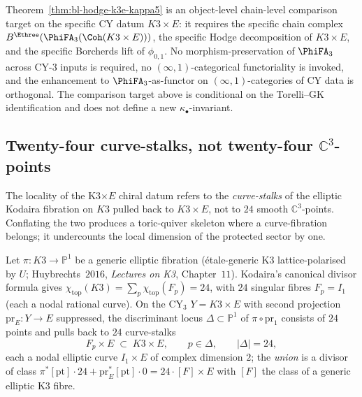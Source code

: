 \begin{remark}
\label{rem:bl-object-level-chain-level-scope-k3e}
Theorem~\ref{thm:bl-hodge-k3e-kappa5} is an object-level chain-level
comparison target on the specific CY datum $K3 \times E$: it requires the
specific chain complex $B^{\Ethree}(\PhiFA_3(\Coh(K3 \times E)))$, the
specific Hodge decomposition of $K3 \times E$, and the specific
Borcherds lift of $\phi_{0, 1}$. No morphism-preservation of $\PhiFA_3$
across CY-$3$ inputs is required, no $(\infty, 1)$-categorical
functoriality is invoked, and the enhancement to $\PhiFA_3$-as-functor on
$(\infty, 1)$-categories of CY data is orthogonal. The comparison target
above is conditional on the Torelli--GK identification and does not define a new
$\kappa_\bullet$-invariant.
\end{remark}

\subsection{Twenty-four curve-stalks, not twenty-four \texorpdfstring{$\mathbb{C}^3$}{C-3}-points}
\label{subsec:24-curve-stalks}

The locality of the K3$\times E$ chiral datum refers to the \emph{curve-stalks} of the elliptic Kodaira fibration on $K3$ pulled back to $K3 \times E$, not to $24$ smooth $\mathbb{C}^3$-points. Conflating the two produces a toric-quiver skeleton where a curve-fibration belongs; it undercounts the local dimension of the protected sector by one.

\begin{proposition}
\label{prop:kodaira-I1-curve-stalks-k3xE}
Let $\pi \colon K3 \to \mathbb{P}^1$ be a generic elliptic fibration (\'etale-generic K3 lattice-polarised by $U$; Huybrechts~$2016$, \emph{Lectures on K3}, Chapter~$11$). Kodaira's canonical divisor formula gives $\chi_{\mathrm{top}}(K3) = \sum_p \chi_{\mathrm{top}}(F_p) = 24$, with $24$ singular fibres $F_p = I_1$ (each a nodal rational curve). On the CY$_3$ $Y = K3 \times E$ with second projection $\mathrm{pr}_E \colon Y \to E$ suppressed, the discriminant locus $\Delta \subset \mathbb{P}^1$ of $\pi \circ \mathrm{pr}_1$ consists of $24$ points and pulls back to $24$ curve-stalks
\[
 F_p \times E \;\subset\; K3 \times E, \qquad p \in \Delta, \qquad |\Delta| = 24,
\]
each a nodal elliptic curve $I_1 \times E$ of complex dimension $2$; the \emph{union} is a divisor of class $\pi^* [\mathrm{pt}] \cdot 24 + \mathrm{pr}_E^* [\mathrm{pt}] \cdot 0 = 24 \cdot [F] \times E$ with $[F]$ the class of a generic elliptic K3 fibre.
\end{proposition}

